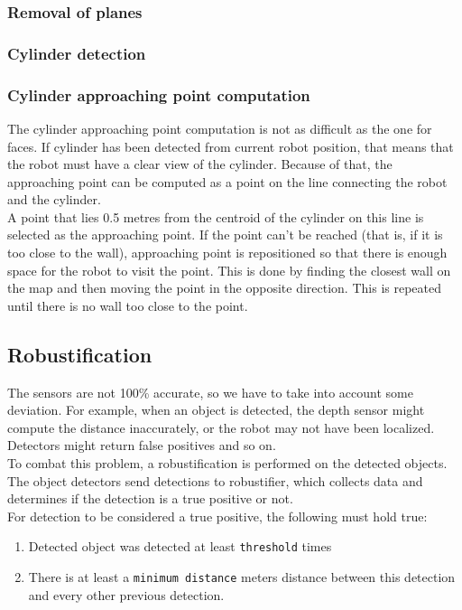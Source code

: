\documentclass[12pt,a4paper]{article}
\begin{document}
	\subsubsection{Removal of planes}
	\subsubsection{Cylinder detection}
	
	\subsubsection{Cylinder approaching point computation}
	The cylinder approaching point computation is not as difficult as the one for faces. If cylinder has been detected from current robot position, that means that the robot must have a clear view of the cylinder. Because of that, the approaching point can be computed as a point on the line connecting the robot and the cylinder. \\
	
	A point that lies 0.5 metres from the centroid of the cylinder on this line is selected as the approaching point. If the point can't be reached (that is, if it is too close to the wall), approaching point is repositioned so that there is enough space for the robot to visit the point. This is done by finding the closest wall on the map and then moving the point in the opposite direction. This is repeated until there is no wall too close to the point. \\
	
	\subsection{Robustification} \label{robustification}
	The sensors are not 100\% accurate, so we have to take into account some deviation. For example, when an object is detected, the depth sensor might compute the distance inaccurately, or the robot may not have been localized. Detectors might return false positives and so on. \\
	
	To combat this problem, a robustification is performed on the detected objects. The object detectors send detections to robustifier, which collects data and determines if the detection is a true positive or not. \\
	
	For detection to be considered a true positive, the following must hold true:
	\begin{enumerate}
		\item Detected object was detected at least \texttt{threshold} times
		\item There is at least a \texttt{minimum distance} meters distance between this detection and every other previous detection.
	\end{enumerate}
\end{document}
